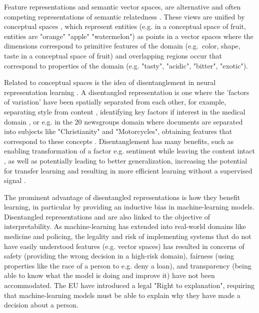 
Feature representations and semantic vector spaces,  are alternative and often competing representations of semantic relatedness \cite{tversky1977features}. These views are unified by conceptual spaces \cite{gardenfors2004conceptual}, which represent entities (e.g. in a conceptual space of fruit, entities are "orange" "apple" "watermelon") as points in a vector spaces  where the dimensions  correspond to primitive features of the domain (e.g.\ color, shape, taste in a conceptual space of fruit) and overlapping regions occur that correspond to properties of the domain (e.g. "tasty", "acidic", "bitter", "exotic").

Related to conceptual spaces is the idea of disentanglement in neural representation learning \cite{Bengio2012}. A disentangled representation is one where the 'factors of variation' have been spatially separated from each other, for example, separating style from content  \cite{Chen2016}  \cite{John2019},  identifying key factors if interest in the medical domain \cite{Banner}, or e.g. in the 20 newsgroups domain where documents are separated into subjects like "Christianity" and "Motorcycles", obtaining features that correspond to these concepts  \cite{Paige2016}. Disentanglement has many benefits, such as  enabling transformation of a factor e.g. sentiment  while leaving the content intact \cite{Larsson2017}, as well as potentially leading to better generalization, increasing the potential for transfer learning and resulting in more efficient learning without a supervised signal \cite{Banner}  \cite{Paige2016}. 

The prominent advantage of disentangled representations is how they benefit learning, in particular by providing an inductive bias in machine-learning models. Disentangled representations and are also linked to the objective of interpretability. As machine-learning has extended into  real-world domains like medicine and policing,  the legality and risk of implementing systems that do not have easily understood features (e.g. vector spaces) has resulted in concerns of safety (providing the wrong decision in a high-risk domain), fairness (using properties like  the race of a person to e.g. deny a loan), and transparency (being able to know what the model is doing and improve it) have not been accommodated. The EU have introduced a legal "Right to explanation", requiring that machine-learning models must be able to explain why they have made a decision about a person. 

